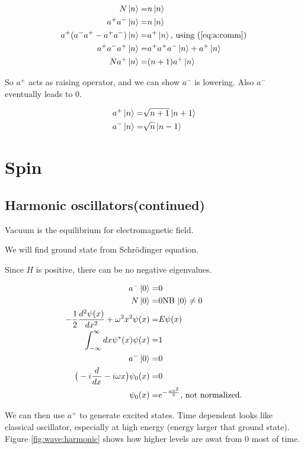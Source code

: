 \documentclass[]{article}
\begin{document}
\begin{align*}
N\ket{n} =& n\ket{n}\\
a^+a^-\ket{n} =& n\ket{n}\\
a^+(a^-a^+ - a^+a^-)\ket{n} =& a^+\ket{n}\text{, using (\ref{eq:a:comm})}\\
a^+a^-a^+ \ket{n} =& a^+a^+a^-\ket{n} + a^+\ket{n}\\
N a^+ \ket{n} =& (n+1) a^+ \ket{n}
\end{align*}

So $a^+$ acts as raising operator, and we can show $a^-$ is lowering. Also $a^-$ eventually leads to $0$.

\begin{align*}
a^+\ket{n} =& \sqrt{n+1}\ket{n+1}\\
a^-\ket{n} =& \sqrt{n}\ket{n-1}
\end{align*}
 
\section{Spin}

\subsection{Harmonic oscillators(continued)}
Vacuum is the equilibrium for electromagnetic field. 

We will find ground state from Schr\"odinger equation.

Since $H$ is positive, there can be no negative eigenvalues.

\begin{align*}
a^-\ket{0}=&0\\
N\ket{0}=& 0\text{NB $\ket{0} \ne 0$}\\
-\frac{1}{2}\frac{d^2 \psi(x)}{dx^2} + \omega^2 x^2 \psi(x)=& E\psi(x)\\
\int_{-\infty}^{\infty} dx \psi^*(x) \psi(x) =& 1\\
a^-\ket{0}=& 0\\
\big(-i \frac{d}{dx} - i \omega x \big)\psi_0(x) =& 0\\
\psi_0(x) =& e^{-\frac{\omega x^2}{2}} \text{, not normalized.}
\end{align*}

We can then use $a^+$  to generate excited states. Time dependent looks like classical oscillator, especially at high energy (energy larger that ground state). Figure \ref{fig:wave:harmonic} shows how higher levels are awat from 0 most of time.
\end{document}
